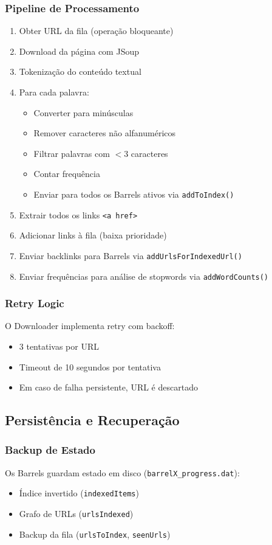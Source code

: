 \documentclass[12pt,a4paper]{article}
\begin{document}
\subsubsection{Pipeline de Processamento}
\begin{enumerate}
    \item Obter URL da fila (operação bloqueante)
    \item Download da página com JSoup
    \item Tokenização do conteúdo textual
    \item Para cada palavra:
    \begin{itemize}
        \item Converter para minúsculas
        \item Remover caracteres não alfanuméricos
        \item Filtrar palavras com $< 3$ caracteres
        \item Contar frequência
        \item Enviar para todos os Barrels ativos via \texttt{addToIndex()}
    \end{itemize}
    \item Extrair todos os links \texttt{<a href>}
    \item Adicionar links à fila (baixa prioridade)
    \item Enviar backlinks para Barrels via \texttt{addUrlsForIndexedUrl()}
    \item Enviar frequências para análise de stopwords via \texttt{addWordCounts()}
\end{enumerate}

\subsubsection{Retry Logic}
O Downloader implementa retry com backoff:
\begin{itemize}
    \item 3 tentativas por URL
    \item Timeout de 10 segundos por tentativa
    \item Em caso de falha persistente, URL é descartado
\end{itemize}

\subsection{Persistência e Recuperação}

\subsubsection{Backup de Estado}
Os Barrels guardam estado em disco (\texttt{barrelX\_progress.dat}):
\begin{itemize}
    \item Índice invertido (\texttt{indexedItems})
    \item Grafo de URLs (\texttt{urlsIndexed})
    \item Backup da fila (\texttt{urlsToIndex}, \texttt{seenUrls})
\end{itemize}
\end{document}

